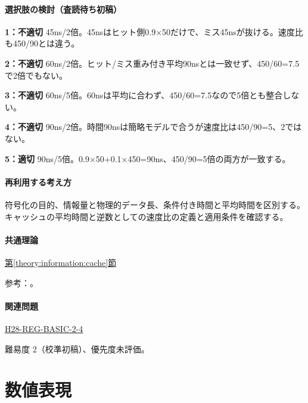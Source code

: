 \paragraph{選択肢の検討（査読待ち初稿）}\mbox{}\par

\noindent\textbf{1：不適切} 45ns/2倍。45nsはヒット側0.9×50だけで、ミス45nsが抜ける。速度比も450/90とは違う。\par

\noindent\textbf{2：不適切} 60ns/2倍。ヒット/ミス重み付き平均90nsとは一致せず、450/60=\allowbreak{}7.5で2倍でもない。\par

\noindent\textbf{3：不適切} 60ns/5倍。60nsは平均に合わず、450/60=\allowbreak{}7.5なので5倍とも整合しない。\par

\noindent\textbf{4：不適切} 90ns/2倍。時間90nsは簡略モデルで合うが速度比は450/90=\allowbreak{}5、2ではない。\par

\noindent\textbf{5：適切} 90ns/5倍。0.9×50+0.1×450=\allowbreak{}90ns、450/90=\allowbreak{}5倍の両方が一致する。\par

\paragraph{再利用する考え方} 符号化の目的、情報量と物理的データ長、条件付き時間と平均時間を区別する。キャッシュの平均時間と逆数としての速度比の定義と適用条件を確認する。

\paragraph{共通理論} \hyperref[theory:information:cache]{第\ref*{theory:information:cache}節}

\par 参考：\cite{info_cache}。

\paragraph{関連問題} \hyperref[q:h28-reg-basic-2-4]{H28-REG-BASIC-2-4}

\par 難易度 2（校準初稿）、優先度未評価。

\section{数値表現}

